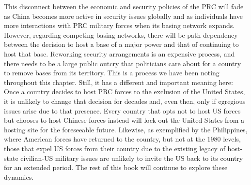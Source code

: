 This disconnect between the economic and security policies of the PRC will fade as China becomes more active in security issues globally and as individuals have more interactions with PRC military forces when its basing network expands. However, regarding competing basing networks, there will be path dependency between the decision to host a base of a major power and that of continuing to host that base. Reworking security arrangements is an expensive process, and there needs to be a large public outcry that politicians care about for a country to remove bases from its territory. This is a process we have been noting throughout this chapter. Still, it has a different and important meaning here: Once a country decides to host PRC forces to the exclusion of the United States, it is unlikely to change that decision for decades and, even then, only if egregious issues arise due to that presence. Every country that opts not to host US forces but chooses to host Chinese forces instead will lock out the United States from a hosting site for the foreseeable future. Likewise, as exemplified by the Philippines, where American forces have returned to the country, but not at the 1980 levels, those that expel US forces from their country due to the existing legacy of host-state civilian-US military issues are unlikely to invite the US back to its country for an extended period. The rest of this book will continue to explore these dynamics. 





